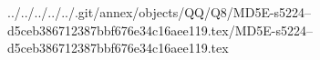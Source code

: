 ../../../../../.git/annex/objects/QQ/Q8/MD5E-s5224--d5ceb386712387bbf676e34c16aee119.tex/MD5E-s5224--d5ceb386712387bbf676e34c16aee119.tex